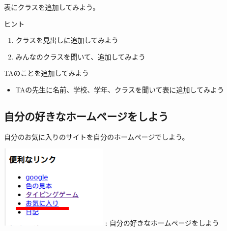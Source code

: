 \documentclass[a4paper,12pt]{jarticle}
\begin{document}
\bigskip

\bigskip

\bigskip

\theQuestion

表にクラスを追加してみよう。

ヒント

\begin{enumerate}
  \item クラスを見出しに追加してみよう
  \item
        みんなのクラスを聞いて、追加してみよう
\end{enumerate}
\theQuestion

TAのことを追加してみよう

\begin{itemize}
  \item
        TAの先生に名前、学校、学年、クラスを聞いて表に追加してみよう
\end{itemize}

\bigskip

\clearpage

\subsection{\theExercise 自分の好きなホームページをしよう}
自分のお気に入りのサイトを自分のホームページでしよう。



\centering
\begin{minipage}{\textwidth}
  {\upshape
    \centering
    \includegraphics[width=0.4\textwidth]{textbook-img193.png}
    \newline
    :
    自分の好きなホームページをしよう}
\end{minipage}



\bigskip

\flushleft
\end{document}
